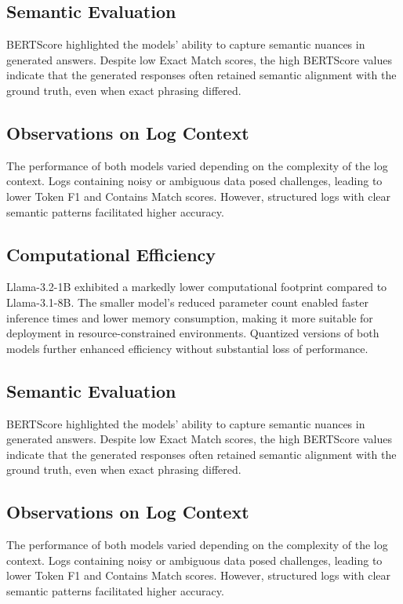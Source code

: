 \documentclass[11pt]{article}
\begin{document}
\subsection{Semantic Evaluation}
BERTScore highlighted the models' ability to capture semantic nuances in generated answers. Despite low Exact Match scores, the high BERTScore values indicate that the generated responses often retained semantic alignment with the ground truth, even when exact phrasing differed.

\subsection{Observations on Log Context}
The performance of both models varied depending on the complexity of the log context. Logs containing noisy or ambiguous data posed challenges, leading to lower Token F1 and Contains Match scores. However, structured logs with clear semantic patterns facilitated higher accuracy.



\subsection{Computational Efficiency}
Llama-3.2-1B exhibited a markedly lower computational footprint compared to Llama-3.1-8B. The smaller model's reduced parameter count enabled faster inference times and lower memory consumption, making it more suitable for deployment in resource-constrained environments. Quantized versions of both models further enhanced efficiency without substantial loss of performance.

\subsection{Semantic Evaluation}
BERTScore highlighted the models' ability to capture semantic nuances in generated answers. Despite low Exact Match scores, the high BERTScore values indicate that the generated responses often retained semantic alignment with the ground truth, even when exact phrasing differed.

\subsection{Observations on Log Context}
The performance of both models varied depending on the complexity of the log context. Logs containing noisy or ambiguous data posed challenges, leading to lower Token F1 and Contains Match scores. However, structured logs with clear semantic patterns facilitated higher accuracy.
\end{document}
